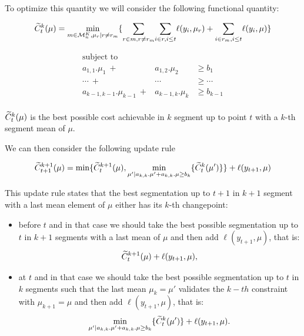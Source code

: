 \documentclass{article}
\begin{document}
To optimize this quantity we will consider the following functional quantity:

\begin{equation}
\widetilde{C}^k_t(\mu) =  \underset{m \in \mathcal{M}^K_n, \mu_r |  r \neq r_m}{\min} 
		\{ 
		   \underset{r \in m, r \neq r_m}{\sum} 
		   \underset{i \in r, i \leq t  }{\sum} \ell(y_i, \mu_{r}) 
		+ 
		   \underset{i \in r_m, i \leq t}{\sum} \ell(y_i, \mu)
		\}  
\end{equation}



\begin{eqnarray*}
\text{subject to} \\
a_{1,1}. \mu_1 \ + & a_{1,2}. \mu_2  & \geq  b_1 \\
\cdots \ + & \cdots & \geq \cdots \\
a_{k-1,k-1}. \mu_{k-1} \ + &a_{k-1,k}. \mu_{k}  & \geq  b_{k-1} \\
\end{eqnarray*}

$\widetilde{C}^k_t(\mu)$ is the best possible cost achievable in $k$ segment up to point $t$ with a $k$-th
segment mean of $\mu$.

We can then consider the following update rule

\begin{equation}
\widetilde{C}^{k+1}_{t+1}(\mu) = \min \{ \widetilde{C}^{k+1}_{t}(\mu)  , \underset{\mu' | a_{k,k}. \mu' + a_{k,k}. \mu  \geq  b_{k}}{\min} \{ \widetilde{C}^{k}_{t}(\mu') \}  \} + \ell(y_{t+1}, \mu)
\label{update}
\end{equation}

This update rule states that the best segmentation up to $t+1$ in $k+1$ segment with a last mean element of $\mu$ either has its $k$-th changepoint:
\begin{itemize}
\item before $t$ and in that case we should take the best possible segmentation up to $t$ in $k+1$
segments with a last mean of $\mu$ and then add  $\ell(y_{t+1}, \mu)$, that is:
$$\widetilde{C}^{k+1}_{t}(\mu) + \ell(y_{t+1}, \mu),$$

\item at $t$ and in that case we should take the best possible segmentation up to $t$ in $k$ segments
such that the last mean $\mu_k=\mu'$ validates the $k-th$ constraint with $\mu_{k+1}=\mu$ and then add  $\ell(y_{t+1}, \mu)$, that is:
 $$\underset{\mu' | a_{k,k}. \mu' + a_{k,k}. \mu  \geq  b_{k}}{\min} \{ \widetilde{C}^{k}_{t}(\mu') \} + \ell(y_{t+1}, \mu).$$
\end{itemize}
\end{document}
